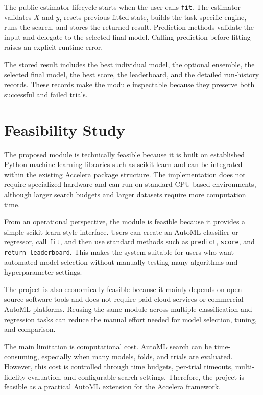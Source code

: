 \documentclass[12pt,a4paper,oneside]{report}
\begin{document}
\noindent The public estimator lifecycle starts when the user calls \texttt{fit}. The
estimator validates \(X\) and \(y\), resets previous fitted state, builds the
task-specific engine, runs the search, and stores the returned result. Prediction
methods validate the input and delegate to the selected final model. Calling
prediction before fitting raises an explicit runtime error.

\noindent The stored result includes the best individual model, the optional ensemble, the
selected final model, the best score, the leaderboard, and the detailed
run-history records. These records make the module inspectable because they
preserve both successful and failed trials.

\chapter{Feasibility Study}

The proposed module is technically feasible because it is built on established
Python machine-learning libraries such as scikit-learn and can be integrated
within the existing Accelera package structure. The implementation does not
require specialized hardware and can run on standard CPU-based environments,
although larger search budgets and larger datasets require more computation
time.

\medskip
\noindent From an operational perspective, the module is feasible because it provides a
simple scikit-learn-style interface. Users can create an AutoML classifier or
regressor, call \texttt{fit}, and then use standard methods such as
\texttt{predict}, \texttt{score}, and \texttt{return\_leaderboard}. This makes
the system suitable for users who want automated model selection without
manually testing many algorithms and hyperparameter settings.

\medskip

\noindent The project is also economically feasible because it mainly depends on
open-source software tools and does not require paid cloud services or
commercial AutoML platforms. Reusing the same module across multiple
classification and regression tasks can reduce the manual effort needed for
model selection, tuning, and comparison.

\medskip
\noindent The main limitation is computational cost. AutoML search can be time-consuming,
especially when many models, folds, and trials are evaluated. However, this cost
is controlled through time budgets, per-trial timeouts, multi-fidelity
evaluation, and configurable search settings. Therefore, the project is feasible
as a practical AutoML extension for the Accelera framework.
\end{document}
